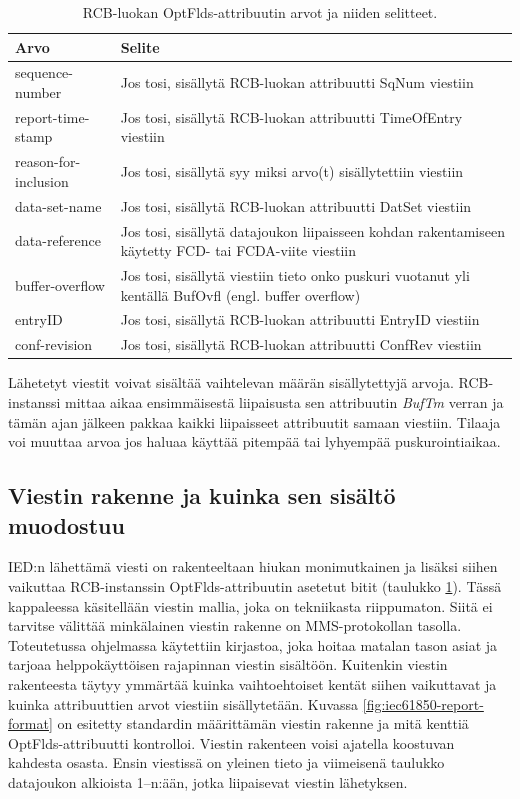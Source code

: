 \begin{table}[ht!]
	\caption{RCB-luokan OptFlds-attribuutin arvot ja niiden selitteet.}
	\label{tab:iec61850-optional-fields-definition}
	\begin{tabular}{l | l}
		\hline
		\textbf{Arvo} & \textbf{Selite} \\
		\hline \hline
		sequence-number & Jos tosi, sisällytä RCB-luokan attribuutti SqNum viestiin \\
		report-time-stamp & Jos tosi, sisällytä RCB-luokan attribuutti TimeOfEntry viestiin \\
		reason-for-inclusion & Jos tosi, sisällytä syy miksi arvo(t) sisällytettiin viestiin \\
		data-set-name & Jos tosi, sisällytä RCB-luokan attribuutti DatSet viestiin \\
		data-reference & \parbox[t]{10cm}{Jos tosi, sisällytä datajoukon liipaisseen kohdan rakentamiseen käytetty FCD- tai FCDA-viite viestiin} \\
		buffer-overflow & \parbox[t]{10cm}{Jos tosi, sisällytä viestiin tieto onko puskuri vuotanut yli kentällä BufOvfl (engl. buffer overflow)} \\
		entryID & Jos tosi, sisällytä RCB-luokan attribuutti EntryID viestiin \\
		conf-revision & Jos tosi, sisällytä RCB-luokan attribuutti ConfRev viestiin \\
		\hline
	\end{tabular}
\end{table}

Lähetetyt viestit voivat sisältää vaihtelevan määrän sisällytettyjä arvoja. RCB-instanssi mittaa aikaa ensimmäisestä liipaisusta sen attribuutin \emph{BufTm} verran ja tämän ajan jälkeen pakkaa kaikki liipaisseet attribuutit samaan viestiin. Tilaaja voi muuttaa arvoa jos haluaa käyttää pitempää tai lyhyempää puskurointiaikaa.


\subsection{Viestin rakenne ja kuinka sen sisältö muodostuu}
\label{ch:viestin-rakenne}
IED:n lähettämä viesti on rakenteeltaan hiukan monimutkainen ja lisäksi siihen vaikuttaa RCB-instanssin OptFlds-attribuutin asetetut bitit (taulukko \ref{tab:iec61850-optional-fields-definition}). Tässä kappaleessa käsitellään viestin mallia, joka on tekniikasta riippumaton. Siitä ei tarvitse välittää minkälainen viestin rakenne on MMS-protokollan tasolla. Toteutetussa ohjelmassa käytettiin kirjastoa, joka hoitaa matalan tason asiat ja tarjoaa helppokäyttöisen rajapinnan viestin sisältöön. Kuitenkin viestin rakenteesta täytyy ymmärtää kuinka vaihtoehtoiset kentät siihen vaikuttavat ja kuinka attribuuttien arvot viestiin sisällytetään. Kuvassa \ref{fig:iec61850-report-format} on esitetty standardin määrittämän viestin rakenne ja mitä kenttiä OptFlds-attribuutti kontrolloi. Viestin rakenteen voisi ajatella koostuvan kahdesta osasta. Ensin viestissä on yleinen tieto ja viimeisenä taulukko datajoukon alkioista 1--n:ään, jotka liipaisevat viestin lähetyksen.

